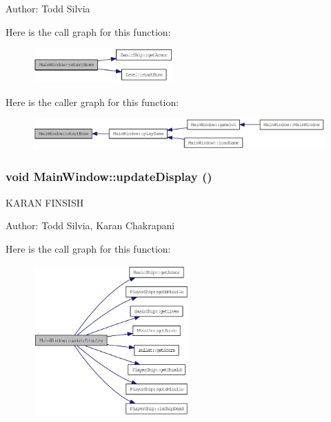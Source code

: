 Author: Todd Silvia 

Here is the call graph for this function:\nopagebreak
\begin{figure}[H]
\begin{center}
\leavevmode
\includegraphics[width=153pt]{class_main_window_addd77660e768b2eedb30c34815e9f1ab_cgraph}
\end{center}
\end{figure}


Here is the caller graph for this function:\nopagebreak
\begin{figure}[H]
\begin{center}
\leavevmode
\includegraphics[width=325pt]{class_main_window_addd77660e768b2eedb30c34815e9f1ab_icgraph}
\end{center}
\end{figure}
\hypertarget{class_main_window_a260413ba6ca75a0e6164fdbd667afd58}{
\subsubsection[{updateDisplay}]{\setlength{\rightskip}{0pt plus 5cm}void MainWindow::updateDisplay ()}}
\label{class_main_window_a260413ba6ca75a0e6164fdbd667afd58}
KARAN FINSISH

Author: Todd Silvia, Karan Chakrapani 

Here is the call graph for this function:\nopagebreak
\begin{figure}[H]
\begin{center}
\leavevmode
\includegraphics[width=170pt]{class_main_window_a260413ba6ca75a0e6164fdbd667afd58_cgraph}
\end{center}
\end{figure}


